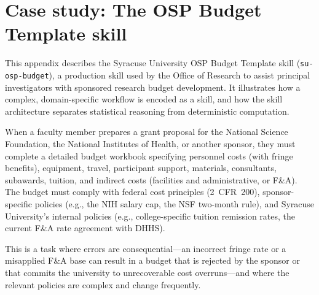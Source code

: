 \documentclass[12pt]{article}
\begin{document}
\appendix

\section{Case study: The OSP Budget Template skill}
\label{app:osp}

This appendix describes the Syracuse University OSP Budget Template skill (\texttt{su-osp-budget}), a production skill used by the Office of Research to assist principal investigators with sponsored research budget development. It illustrates how a complex, domain-specific workflow is encoded as a skill, and how the skill architecture separates statistical reasoning from deterministic computation.

When a faculty member prepares a grant proposal for the National Science Foundation, the National Institutes of Health, or another sponsor, they must complete a detailed budget workbook specifying personnel costs (with fringe benefits), equipment, travel, participant support, materials, consultants, subawards, tuition, and indirect costs (facilities and administrative, or F\&A). The budget must comply with federal cost principles (2~CFR~200), sponsor-specific policies (e.g., the NIH salary cap, the NSF two-month rule), and Syracuse University's internal policies (e.g., college-specific tuition remission rates, the current F\&A rate agreement with DHHS).

This is a task where errors are consequential---an incorrect fringe rate or a misapplied F\&A base can result in a budget that is rejected by the sponsor or that commits the university to unrecoverable cost overruns---and where the relevant policies are complex and change frequently.
\end{document}
